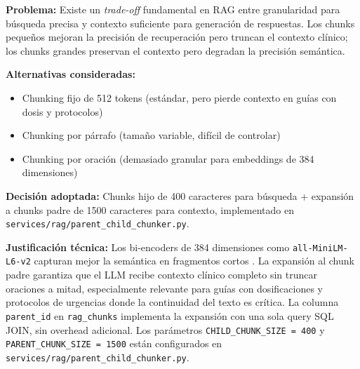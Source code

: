\begin{tcolorbox}[
  enhanced, breakable,
  colback=teal!4, colframe=teal!45,
  title={\footnotesize\sffamily\bfseries Decisión 2 — Chunking jerárquico padre-hijo (vs.\ chunking uniforme)},
  fonttitle=\color{white},
  attach boxed title to top left={yshift=-2mm, xshift=4mm},
  boxed title style={colback=teal!55, rounded corners},
  left=4pt, right=4pt, top=4pt, bottom=4pt
]
\footnotesize
\textbf{Problema:} Existe un \textit{trade-off} fundamental en RAG entre granularidad para búsqueda precisa y contexto suficiente para generación de respuestas. Los chunks pequeños mejoran la precisión de recuperación pero truncan el contexto clínico; los chunks grandes preservan el contexto pero degradan la precisión semántica.

\textbf{Alternativas consideradas:}
\begin{itemize}[nosep, leftmargin=*]
  \item Chunking fijo de 512 tokens (estándar, pero pierde contexto en guías con dosis y protocolos)
  \item Chunking por párrafo (tamaño variable, difícil de controlar)
  \item Chunking por oración (demasiado granular para embeddings de 384 dimensiones)
\end{itemize}

\textbf{Decisión adoptada:} Chunks hijo de 400 caracteres para búsqueda + expansión a chunks padre de 1500 caracteres para contexto, implementado en \texttt{services/rag/parent\_child\_chunker.py}.

\textbf{Justificación técnica:} Los bi-encoders de 384 dimensiones como \texttt{all-MiniLM-L6-v2} capturan mejor la semántica en fragmentos cortos \citep{Wang2020}. La expansión al chunk padre garantiza que el LLM recibe contexto clínico completo sin truncar oraciones a mitad, especialmente relevante para guías con dosificaciones y protocolos de urgencias donde la continuidad del texto es crítica. La columna \texttt{parent\_id} en \texttt{rag\_chunks} implementa la expansión con una sola query SQL JOIN, sin overhead adicional. Los parámetros \texttt{CHILD\_CHUNK\_SIZE = 400} y \texttt{PARENT\_CHUNK\_SIZE = 1500} están configurados en \texttt{services/rag/parent\_child\_chunker.py}.
\end{tcolorbox}


